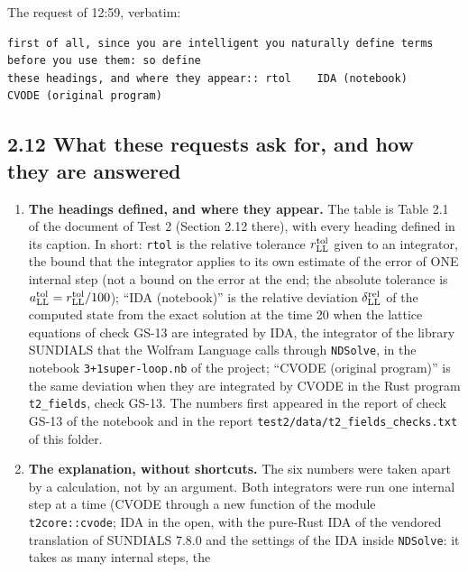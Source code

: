 \documentclass[
  10pt,
]{article}
\providecommand{\tightlist}{%
  \setlength{\itemsep}{0pt}\setlength{\parskip}{0pt}}
\begin{document}
The request of 12:59, verbatim:

\begin{verbatim}
first of all, since you are intelligent you naturally define terms before you use them: so define
these headings, and where they appear:: rtol    IDA (notebook)    CVODE (original program)
\end{verbatim}

\hypertarget{what-these-requests-ask-for-and-how-they-are-answered-2}{%
\subsection{2.12 What these requests ask for, and how they are
answered}\label{what-these-requests-ask-for-and-how-they-are-answered-2}}

\begin{enumerate}
\def\labelenumi{\arabic{enumi}.}
\tightlist
\item
  \textbf{The headings defined, and where they appear.} The table is
  Table 2.1 of the document of Test 2 (Section 2.12 there), with every
  heading defined in its caption. In short: \texttt{rtol} is the
  relative tolerance \(r^{\rm tol}_{\rm LL}\) given to an integrator,
  the bound that the integrator applies to its own estimate of the error
  of ONE internal step (not a bound on the error at the end; the
  absolute tolerance is
  \(a^{\rm tol}_{\rm LL}=r^{\rm tol}_{\rm LL}/100\)); ``IDA (notebook)''
  is the relative deviation \(\delta^{\rm rel}_{\rm LL}\) of the
  computed state from the exact solution at the time 20 when the lattice
  equations of check GS-13 are integrated by IDA, the integrator of the
  library SUNDIALS that the Wolfram Language calls through
  \texttt{NDSolve}, in the notebook \texttt{3+1super-loop.nb} of the
  project; ``CVODE (original program)'' is the same deviation when they
  are integrated by CVODE in the Rust program \texttt{t2\_fields}, check
  GS-13. The numbers first appeared in the report of check GS-13 of the
  notebook and in the report \texttt{test2/data/t2\_fields\_checks.txt}
  of this folder.
\item
  \textbf{The explanation, without shortcuts.} The six numbers were
  taken apart by a calculation, not by an argument. Both integrators
  were run one internal step at a time (CVODE through a new function of
  the module \texttt{t2core::cvode}; IDA in the open, with the pure-Rust
  IDA of the vendored translation of SUNDIALS 7.8.0 and the settings of
  the IDA inside \texttt{NDSolve}: it takes as many internal steps, the

\end{enumerate}
\end{document}

